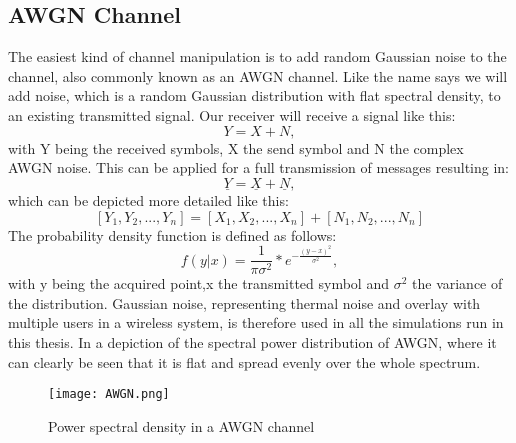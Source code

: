 \subsection{AWGN Channel}
\label{AWGN}

The easiest kind of channel manipulation is to add random Gaussian noise to the channel, also commonly known as an \gls{AWGN} channel. Like the name says we will add noise, which is a random Gaussian distribution with flat spectral density, to an existing transmitted signal. Our receiver will receive a signal like this:
\begin{equation}
\label{eq:1.1}
Y = X + N ,
\end{equation}
with Y being the received symbols, X the send symbol and N the complex AWGN noise. This can be applied for a full transmission of messages resulting in:
\begin{equation}
\label{eq:1.2}
\underline{Y} = \underline{X} + \underline{N},
\end{equation}
which can be depicted more detailed like this:
\begin{equation}
\label{eq:1.3}
[Y_1,Y_2,...,Y_n] = [X_1,X_2,...,X_n] + [N_1,N_2,...,N_n]
\end{equation}
 The probability density function is defined as follows:
\begin{equation}
\label{eq:AWGNpdf}
f(y|x) = \frac{1}{\pi\sigma^2}*e^{-\frac{(y-x)^2}{\sigma^2}},  
\end{equation}
with y being the acquired point,x the transmitted symbol and $\sigma^2$ the variance of the distribution.
Gaussian noise, representing thermal noise and overlay with multiple users in a wireless system, is therefore used in all the simulations run in this thesis. In  a depiction of the spectral power distribution of \gls{AWGN}, where it can clearly be seen that it is flat and spread evenly over the whole spectrum.
\begin{figure}[!htb]
	\centering
	\texttt{[image: AWGN.png]}
	\caption{Power spectral density in a AWGN channel}
	\label{fig:AWGN}
\end{figure}
\newpage
